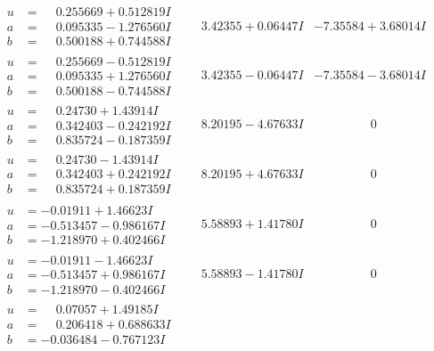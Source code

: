 \documentclass[1p]{elsarticle_modified}
\theoremstyle{definition}
\begin{document}
$$\begin{array}{c|c|c}
\begin{aligned}
u &= \phantom{-}0.255669 + 0.512819 I \\
a &= \phantom{-}0.095335 - 1.276560 I \\
b &= \phantom{-}0.500188 + 0.744588 I\end{aligned}
 & \phantom{-}3.42355 + 0.06447 I & -7.35584 + 3.68014 I \\ \hline\begin{aligned}
u &= \phantom{-}0.255669 - 0.512819 I \\
a &= \phantom{-}0.095335 + 1.276560 I \\
b &= \phantom{-}0.500188 - 0.744588 I\end{aligned}
 & \phantom{-}3.42355 - 0.06447 I & -7.35584 - 3.68014 I \\ \hline\begin{aligned}
u &= \phantom{-}0.24730 + 1.43914 I \\
a &= \phantom{-}0.342403 - 0.242192 I \\
b &= \phantom{-}0.835724 - 0.187359 I\end{aligned}
 & \phantom{-}8.20195 - 4.67633 I & \phantom{-0.000000 } 0 \\ \hline\begin{aligned}
u &= \phantom{-}0.24730 - 1.43914 I \\
a &= \phantom{-}0.342403 + 0.242192 I \\
b &= \phantom{-}0.835724 + 0.187359 I\end{aligned}
 & \phantom{-}8.20195 + 4.67633 I & \phantom{-0.000000 } 0 \\ \hline\begin{aligned}
u &= -0.01911 + 1.46623 I \\
a &= -0.513457 - 0.986167 I \\
b &= -1.218970 + 0.402466 I\end{aligned}
 & \phantom{-}5.58893 + 1.41780 I & \phantom{-0.000000 } 0 \\ \hline\begin{aligned}
u &= -0.01911 - 1.46623 I \\
a &= -0.513457 + 0.986167 I \\
b &= -1.218970 - 0.402466 I\end{aligned}
 & \phantom{-}5.58893 - 1.41780 I & \phantom{-0.000000 } 0 \\ \hline\begin{aligned}
u &= \phantom{-}0.07057 + 1.49185 I \\
a &= \phantom{-}0.206418 + 0.688633 I \\
b &= -0.036484 - 0.767123 I\end{aligned}

\end{array}$$
\end{document}
